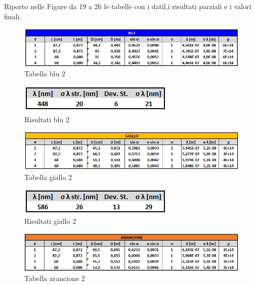\documentclass{article}
\begin{document}
\vspace{3mm}

Riporto nelle Figure da 19 a 26 le tabelle con i datil,i risultati parziali e i valori finali.

\begin{figure}[h!]
  \centering
  \includegraphics[width=1\linewidth]{IM tabella blu 2}
  \caption{Tabella blu 2}
\end{figure}

\begin{figure}[h!]
  \centering
  \includegraphics[width=0.4\linewidth]{IM risultati blu 2}
  \caption{Risultati blu 2}
\end{figure}

\begin{figure}[h!]
  \centering
  \includegraphics[width=1\linewidth]{IM tabella giallo 2}
  \caption{Tabella giallo 2}
\end{figure}

\begin{figure}[h!]
  \centering
  \includegraphics[width=0.4\linewidth]{IM risultati giallo 2}
  \caption{Risultati giallo 2}
\end{figure}

\begin{figure}[h!]
  \centering
  \includegraphics[width=1\linewidth]{IM tabella arancio 2}
  \caption{Tabella arancione 2}
\end{figure}
\end{document}
